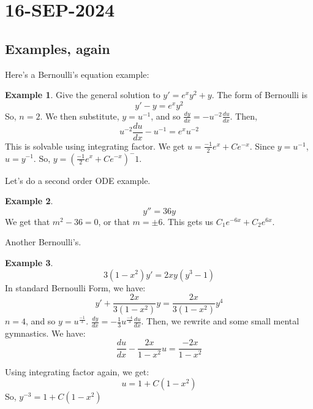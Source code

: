 \documentclass[10pt, oneside]{article}
\theoremstyle{definition}
\newtheorem{example}{Example}[section]
\begin{document}
\section{16-SEP-2024}
\subsection{Examples, again}
Here's a Bernoulli's equation example:
\begin{example}
    Give the general solution to $y' = e^xy^2 + y$.
    The form of Bernoulli is 
    \[ 
    y' - y = e^xy^2
    \]
    So, $n=2$. We then substitute, $y = u^{-1}$, and so $\frac{dy}{dx} = -u^{-2} \frac{du}{dx}$. Then, 
    \[
        u^{-2} \frac{du}{dx} - u^{-1} = e^xu^{-2}
    \]
    This is solvable using integrating factor. We get $u = \frac{-1}{2}e^x + Ce^{-x}$. Since $y = u^{-1}$, $u = y^{-1}$. So, $y = (\frac{-1}{2}e^x + Ce^{-x})^-1$.
\end{example}
Let's do a second order ODE example.
\begin{example}
    \[
    y'' = 36y
    \]
    We get that $m^2 - 36 = 0$, or that $m = \pm 6$. This gets us $C_1e^{-6x} + C_2e^{6x}$. 
\end{example}
Another Bernoulli's. 
\begin{example}
    \[3(1-x^2)y' = 2xy(y^3-1) \]
    In standard Bernoulli Form, we have:
    \[
    y' + \frac{2x}{3(1-x^2)}y = \frac{2x}{3(1-x^2)}y^4
    \]
    $n = 4$, and so $ y = u^\frac{-1}{3} $. $\frac{dy}{dx} = -\frac{1}{3}u^\frac{-4}{3}\frac{du}{dx}$. Then, we rewrite and some small mental gymnastics.
    We have:
    \[ 
    \frac{du}{dx} - \frac{2x}{1-x^2}u = \frac{-2x}{1-x^2}
    \]

    Using integrating factor again, we get:
    \[ 
    u = 1 + C(1-x^2)
    \]
    So, $y^{-3} = 1 + C(1-x^2)$
\end{example}
\end{document}
